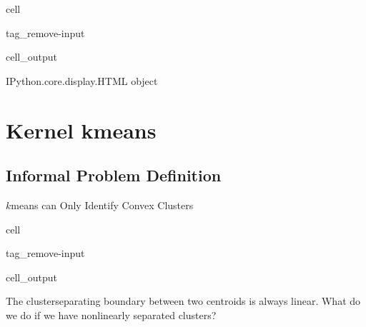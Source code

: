 \documentclass[letterpaper,10pt,english]{jupyterBook}
\begin{document}
\begin{sphinxuseclass}{cell}
\begin{sphinxuseclass}{tag_remove-input}\begin{sphinxVerbatimOutput}

\begin{sphinxuseclass}{cell_output}
\begin{sphinxVerbatim}[commandchars=\\\{\}]
\PYGZlt{}IPython.core.display.HTML object\PYGZgt{}
\end{sphinxVerbatim}

\end{sphinxuseclass}\end{sphinxVerbatimOutput}

\end{sphinxuseclass}
\end{sphinxuseclass}
\sphinxstepscope


\section{Kernel k\sphinxhyphen{}means}
\label{\detokenize{clustering_kernel_kmeans:kernel-k-means}}\label{\detokenize{clustering_kernel_kmeans::doc}}

\subsection{Informal Problem Definition}
\label{\detokenize{clustering_kernel_kmeans:informal-problem-definition}}
\sphinxAtStartPar
\(k\)\sphinxhyphen{}means can Only Identify Convex Clusters

\begin{sphinxuseclass}{cell}
\begin{sphinxuseclass}{tag_remove-input}\begin{sphinxVerbatimOutput}

\begin{sphinxuseclass}{cell_output}
\noindent{}

\end{sphinxuseclass}\end{sphinxVerbatimOutput}

\end{sphinxuseclass}
\end{sphinxuseclass}
\sphinxAtStartPar
The cluster\sphinxhyphen{}separating boundary between two centroids is always linear. What do we do if we have nonlinearly separated clusters?
\end{document}
